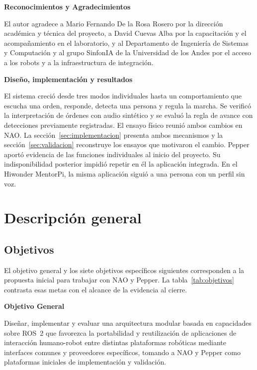 \documentclass[11pt,letterpaper]{article}
\begin{document}
\par\medskip\noindent\textbf{Reconocimientos y Agradecimientos}\par

El autor agradece a Mario Fernando De la Rosa Rosero por la dirección académica y técnica del proyecto, a David Cuevas Alba por la capacitación y el acompañamiento en el laboratorio, y al Departamento de Ingeniería de Sistemas y Computación y al grupo SinfonIA de la Universidad de los Andes por el acceso a los robots y a la infraestructura de integración.

\par\medskip\noindent\textbf{Diseño, implementación y resultados}\par

El sistema creció desde tres modos individuales hasta un comportamiento que escucha una orden, responde, detecta una persona y regula la marcha. Se verificó la interpretación de órdenes con audio sintético y se evaluó la regla de avance con detecciones previamente registradas. El ensayo físico reunió ambos cambios en NAO. La sección~\ref{sec:implementacion} presenta ambos mecanismos y la sección~\ref{sec:validacion} reconstruye los ensayos que motivaron el cambio. Pepper aportó evidencia de las funciones individuales al inicio del proyecto. Su indisponibilidad posterior impidió repetir en él la aplicación integrada. En el Hiwonder MentorPi, la misma aplicación siguió a una persona con un perfil sin voz.

\clearpage
\section{Descripción general}
\subsection{Objetivos}

El objetivo general y los siete objetivos específicos siguientes corresponden a la propuesta inicial para trabajar con NAO y Pepper. La tabla~\ref{tab:objetivos} contrasta esas metas con el alcance de la evidencia al cierre.

\par\medskip\noindent\textbf{Objetivo General}\par

Diseñar, implementar y evaluar una arquitectura modular basada en capacidades sobre ROS~2 que favorezca la portabilidad y reutilización de aplicaciones de interacción humano-robot entre distintas plataformas robóticas mediante interfaces comunes y proveedores específicos, tomando a NAO y Pepper como plataformas iniciales de implementación y validación.
\end{document}
